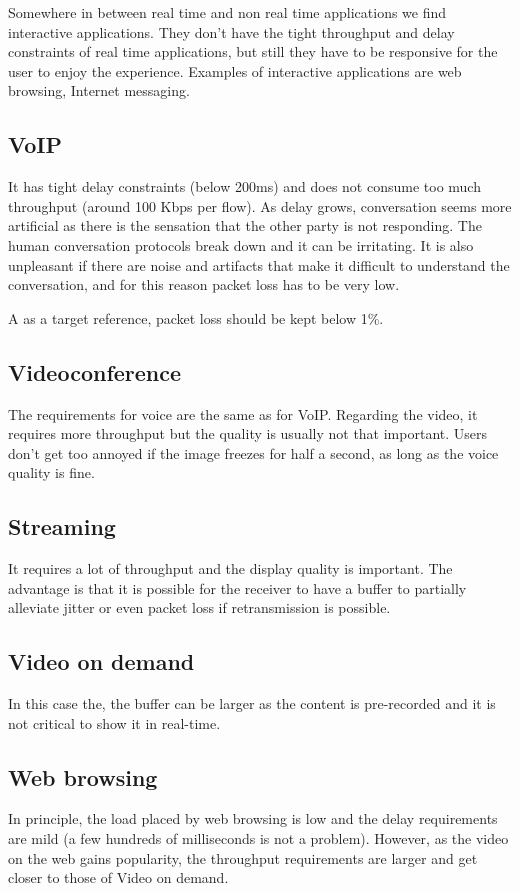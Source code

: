 Somewhere in between real time and non real time applications we find interactive applications. 
They don't have the tight throughput and delay constraints of real time applications, but still they have to be responsive for the user to enjoy the experience.
Examples of interactive applications are web browsing, Internet messaging.

\subsection{VoIP}
It has tight delay constraints (below 200ms) and does not consume too much throughput (around 100 Kbps per flow).
As delay grows, conversation seems more artificial as there is the sensation that the other party is not responding.
The human conversation protocols break down and it can be irritating.
It is also unpleasant if there are noise and artifacts that make it difficult to understand the conversation, and for this reason packet loss has to be very low.

A as a target reference, packet loss should be kept below 1\%.

\subsection{Videoconference}
The requirements for voice are the same as for VoIP.
Regarding the video, it requires more throughput but the quality is usually not that important.
Users don't get too annoyed if the image freezes for half a second, as long as the voice quality is fine.

\subsection{Streaming}
It requires a lot of throughput and the display quality is important.
The advantage is that it is possible for the receiver to have a buffer to partially alleviate jitter or even packet loss if retransmission is possible.

\subsection{Video on demand}
In this case the, the buffer can be larger as the content is pre-recorded and it is not critical to show it in real-time.

\subsection{Web browsing}
In principle, the load placed by web browsing is low and the delay requirements are mild (a few hundreds of milliseconds is not a problem). 
However, as the video on the web gains popularity, the throughput requirements are larger and get closer to those of Video on demand.

